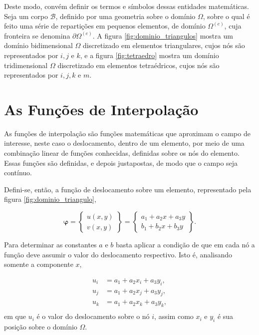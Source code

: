 Deste modo, convém definir os termos e símbolos dessas entidades matemáticas. Seja um corpo $\mathcal{B}$, definido por uma geometria sobre o domínio $\Omega$, sobre o qual é feito uma série de repartições em pequenos elementos, de domínio $\Omega^{(e)}$, cuja fronteira se denomina $\partial\Omega^{(e)}$. A figura \ref{fig:dominio_triangulos} mostra um domínio bidimensional $\Omega$ discretizado em elementos triangulares, cujos nós são representados por $i, j$ e $k$, e a figura \ref{fig:tetraedro} mostra um domínio tridimensional $\Omega$ discretizado em elementos tetraédricos, cujos nós são representados por $i, j, k$ e $m$.





\section{As Funções de Interpolação}

As funções de interpolação são funções matemáticas que aproximam o campo de interesse, neste caso o deslocamento, dentro de um elemento, por meio de uma combinação linear de funções conhecidas, definidas sobre os nós do elemento. Essas funções são definidas, e depois justapostas, de modo que o campo seja contínuo. \cite{logan} 


Defini-se, então, a função de deslocamento sobre um elemento, representado pela figura \ref{fig:dominio_triangulo},

\begin{equation}
    \mathbf{\varphi} = \begin{Bmatrix}
        u(x,y) \\ v(x,y) 
    \end{Bmatrix} = \begin{Bmatrix}
        a_1 + a_2 x + a_3 y \\ b_1 + b_2 x + b_3 y 
    \end{Bmatrix}.
\end{equation}

Para determinar as constantes $a$ e $b$ basta aplicar a condição de que em cada nó a função deve assumir o valor do deslocamento respectivo. Isto é, analisando somente a componente $x$,

\begin{align}
    u_i &= a_1 + a_2 x_i + a_3 y_i, \\
    u_j &= a_1 + a_2 x_j + a_3 y_j, \\
    u_k &= a_1 + a_2 x_k + a_3 y_k, \\
\end{align}
em que $u_i$ é o valor do deslocamento sobre o nó $i$, assim como $x_i$ e $y_i$ é sua posição sobre o domínio $\Omega$.

